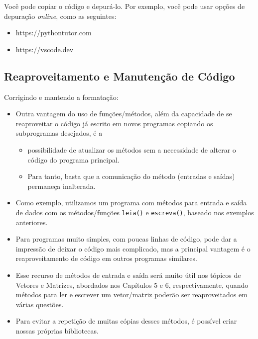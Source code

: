 \documentclass[12pt,a4paper]{article}
\providecommand{\tightlist}{%
      \setlength{\itemsep}{0pt}\setlength{\parskip}{0pt}}
\begin{document}
    Você pode copiar o código e depurá-lo. Por exemplo, você pode usar
opções de depuração \emph{online}, como as seguintes:

\begin{itemize}
\tightlist
\item
  https://pythontutor.com
\item
  https://vscode.dev
\end{itemize}

    \hypertarget{reaproveitamento-e-manutenuxe7uxe3o-de-cuxf3digo}{%
\subsection{Reaproveitamento e Manutenção de
Código}\label{reaproveitamento-e-manutenuxe7uxe3o-de-cuxf3digo}}

    Corrigindo e mantendo a formatação:

\begin{itemize}
\item
  Outra vantagem do uso de funções/métodos, além da capacidade de se
  reaproveitar o código já escrito em novos programas copiando os
  subprogramas desejados, é a

  \begin{itemize}
  \tightlist
  \item
    possibilidade de atualizar os métodos sem a necessidade de alterar o
    código do programa principal.
  \item
    Para tanto, basta que a comunicação do método (entradas e saídas)
    permaneça inalterada.
  \end{itemize}
\item
  Como exemplo, utilizamos um programa com métodos para entrada e saída
  de dados com os métodos/funções \texttt{leia()} e \texttt{escreva()},
  baseado nos exemplos anteriores.
\item
  Para programas muito simples, com poucas linhas de código, pode dar a
  impressão de deixar o código mais complicado, mas a principal vantagem
  é o reaproveitamento de código em outros programas similares.
\item
  Esse recurso de métodos de entrada e saída será muito útil nos tópicos
  de Vetores e Matrizes, abordados nos Capítulos 5 e 6, respectivamente,
  quando métodos para ler e escrever um vetor/matriz poderão ser
  reaproveitados em várias questões.
\item
  Para evitar a repetição de muitas cópias desses métodos, é possível
  criar nossas próprias bibliotecas.
\end{itemize}
\end{document}
